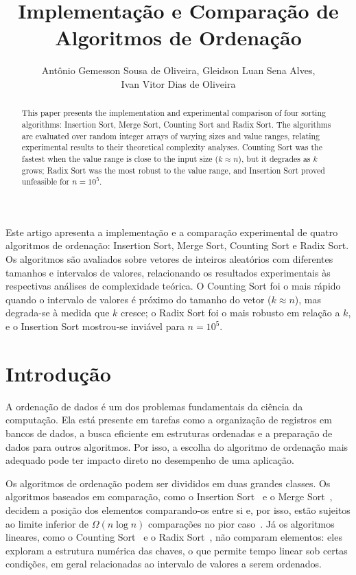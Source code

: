 \documentclass[12pt]{article}
\title{Implementação e Comparação de Algoritmos de Ordenação}
\author{Antônio Gemesson Sousa de Oliveira\inst{1}, Gleidson Luan Sena Alves\inst{1}, \\ Ivan Vitor Dias de Oliveira\inst{1}}
\begin{document}
\maketitle

\begin{abstract}
  This paper presents the implementation and experimental comparison of four
  sorting algorithms: Insertion Sort, Merge Sort, Counting Sort and Radix Sort.
  The algorithms are evaluated over random integer arrays of varying sizes and
  value ranges, relating experimental results to their theoretical complexity
  analyses. Counting Sort was the fastest when the value range is close to the
  input size ($k \approx n$), but it degrades as $k$ grows; Radix Sort was the
  most robust to the value range, and Insertion Sort proved unfeasible for
  $n = 10^5$.
\end{abstract}

\begin{resumo}
  Este artigo apresenta a implementação e a comparação experimental de quatro
  algoritmos de ordenação: Insertion Sort, Merge Sort, Counting Sort e
  Radix Sort. Os algoritmos são avaliados sobre vetores de inteiros aleatórios
  com diferentes tamanhos e intervalos de valores, relacionando os resultados
  experimentais às respectivas análises de complexidade teórica. O Counting
  Sort foi o mais rápido quando o intervalo de valores é próximo do tamanho do
  vetor ($k \approx n$), mas degrada-se à medida que $k$ cresce; o Radix Sort
  foi o mais robusto em relação a $k$, e o Insertion Sort mostrou-se inviável
  para $n = 10^5$.
\end{resumo}

\section{Introdução}

A ordenação de dados é um dos problemas fundamentais da ciência da
computação. Ela está presente em tarefas como a organização de registros em
bancos de dados, a busca eficiente em estruturas ordenadas e a preparação de
dados para outros algoritmos. Por isso, a escolha do algoritmo de ordenação
mais adequado pode ter impacto direto no desempenho de uma aplicação.

Os algoritmos de ordenação podem ser divididos em duas grandes classes. Os
algoritmos baseados em comparação, como o Insertion Sort~\cite{gfg-insertion}
e o Merge Sort~\cite{gfg-merge}, decidem a posição dos elementos comparando-os
entre si e, por isso, estão sujeitos ao limite inferior de $\Omega(n \log n)$
comparações no pior caso~\cite{cormen2012}. Já os algoritmos lineares, como o
Counting Sort~\cite{gfg-counting} e o Radix Sort~\cite{gfg-radix}, não
comparam elementos: eles exploram a estrutura numérica das chaves, o que
permite tempo linear sob certas condições, em geral relacionadas ao intervalo
de valores a serem ordenados.
\end{document}
